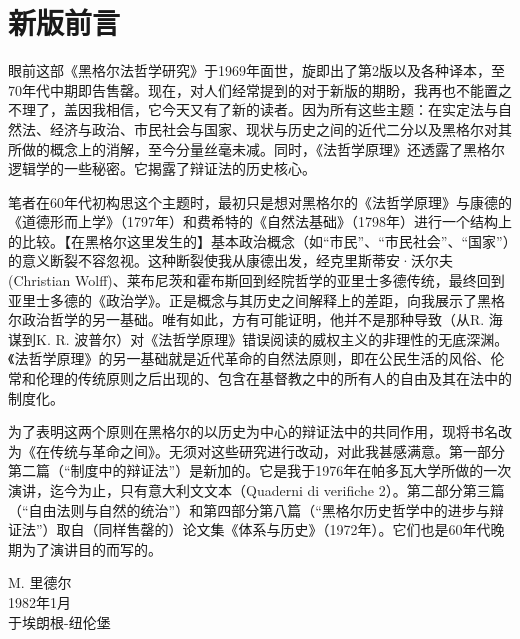 \chapter*{新版前言}

眼前这部《黑格尔法哲学研究》于1969年面世，旋即出了第2版以及各种译本，至70年代中期即告售罄。现在，对人们经常提到的对于新版的期盼，我再也不能置之不理了，盖因我相信，它今天又有了新的读者。因为所有这些主题：在实定法与自然法、经济与政治、市民社会与国家、现状与历史之间的近代二分以及黑格尔对其所做的概念上的消解，至今分量丝毫未减。同时，《法哲学原理》还透露了黑格尔逻辑学的一些秘密。它揭露了辩证法的历史核心。

笔者在60年代初构思这个主题时，最初只是想对黑格尔的《法哲学原理》与康德的《道德形而上学》（1797年）和费希特的《自然法基础》（1798年）进行一个结构上的比较。【在黑格尔这里发生的】基本政治概念（如“市民”、“市民社会”、“国家”）的意义断裂不容忽视。这种断裂使我从康德出发，经克里斯蒂安·沃尔夫(Christian Wolff)、莱布尼茨和霍布斯回到经院哲学的亚里士多德传统，最终回到亚里士多德的《政治学》。正是概念与其历史之间解释上的差距，向我展示了黑格尔政治哲学的另一基础。唯有如此，方有可能证明，他并不是那种导致（从R. 海谋到K. R. 波普尔）对《法哲学原理》错误阅读的威权主义的非理性的无底深渊。《法哲学原理》的另一基础就是近代革命的自然法原则，即在公民生活的风俗、伦常和伦理的传统原则之后出现的、包含在基督教之中的所有人的自由及其在法中的制度化。

为了表明这两个原则在黑格尔的以历史为中心的辩证法中的共同作用，现将书名改为《在传统与革命之间》。无须对这些研究进行改动，对此我甚感满意。第一部分第二篇（“制度中的辩证法”）是新加的。它是我于1976年在帕多瓦大学所做的一次演讲，迄今为止，只有意大利文文本（Quaderni di verifiche 2）。第二部分第三篇（“自由法则与自然的统治”）和第四部分第八篇（“黑格尔历史哲学中的进步与辩证法”）取自（同样售罄的）论文集《体系与历史》（1972年）。它们也是60年代晚期为了演讲目的而写的。

\begin{flushright}
M. 里德尔\\
1982年1月\\
于埃朗根-纽伦堡
\end{flushright}
